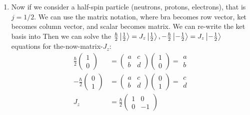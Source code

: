 \documentclass{school-22.101-notes}
\begin{document}
\begin{enumerate}
\begin{enumerate}
  \item Now if we consider a half-spin particle (neutrons, protons, electrons), that is $j = 1/2$. We can use the matrix notation, where bra becomes row vector, ket becomes column vector, and scalar becomes matrix. We can re-write the ket basis into 
    Then we can solve the $\frac{\hbar}{2} \left| \frac{1}{2} \right> = J_z \left| \frac{1}{2} \right>, - \frac{\hbar}{2} \left| -\frac{1}{2} \right> = J_z \left| -\frac{1}{2} \right>$ equations for the-now-matrix-$J_z$: 
    \begin{align}
      \frac{\hbar}{2}  \left( \begin{array}{c} 1 \\ 0 \end{array} \right) &=  \left( \begin{array}{cc} a & c \\ b & d   \end{array} \right)  \left( \begin{array}{c} 1 \\ 0 \end{array} \right) = \begin{array}{c} a \\ b \end{array} \\
      - \frac{\hbar}{2}  \left( \begin{array}{c} 0 \\ 1 \end{array} \right) &=  \left( \begin{array}{cc} a & c \\ b & d   \end{array} \right)  \left( \begin{array}{c} 0 \\ 1 \end{array} \right) = \begin{array}{c} c \\ d \end{array} \\
      J_z &= \frac{\hbar}{2} \left( \begin{array}{cc} 1 & 0 \\ 0 & -1 \end{array} \right) 

\end{align}
\end{enumerate}
\end{enumerate}
\end{document}

